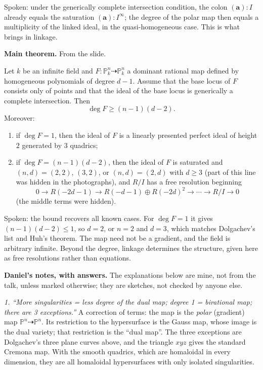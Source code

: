 \medskip\noindent
Spoken: under the generically complete
intersection condition, the colon $(\mathbf
a) : I$ already equals the saturation
$(\mathbf a) : I^\infty$; the degree of the
polar map then equals a multiplicity of the
linked ideal, in the quasi-homogeneous case.
This is what brings in linkage.

\medskip\noindent
{\bf Main theorem.} From the slide.

\begin{theorem}
\label{theorem-hassanzadeh-main}
Let $k$ be an infinite field and
$F : \mathbb{P}^n_k \dashrightarrow
\mathbb{P}^n_k$ a dominant rational map
defined by homogeneous polynomials of degree
$d-1$. Assume that the base locus of $F$
consists only of points and that the ideal
of the base locus is generically a complete
intersection. Then
$$
\deg F \ge (n-1)(d-2).
$$
Moreover:
\begin{enumerate}
\item if $\deg F = 1$, then the ideal of $F$
is a linearly presented perfect ideal of
height $2$ generated by $3$ quadrics;
\item if $\deg F = (n-1)(d-2)$, then the
ideal of $F$ is saturated and
$(n,d) = (2,2)$, $(3,2)$, or
$(n,d) = (2,d)$ with $d \ge 3$ (part of this
line was hidden in the photographs), and
$R/I$ has a free resolution beginning
$$
0 \to R(-2d-1) \to
R(-d-1) \oplus R(-2d)^2 \to \cdots
\to R/I \to 0
$$
(the middle terms were hidden).
\end{enumerate}
\end{theorem}

\noindent
Spoken: the bound recovers all known cases.
For $\deg F = 1$ it gives
$(n-1)(d-2) \le 1$, so $d = 2$, or $n = 2$
and $d = 3$, which matches Dolgachev's list
and Huh's theorem. The map need not be a
gradient, and the field is arbitrary
infinite. Beyond the degree, linkage
determines the structure, given here as free
resolutions rather than equations.

\medskip\noindent
{\bf Daniel's notes, with answers.} The
explanations below are mine, not from the
talk, unless marked otherwise; they are
sketches, not checked by anyone else.

\medskip\noindent
{\it 1. ``More singularities = less degree of
the dual map; degree 1 = birational map;
there are 3 exceptions.''} A correction of
terms: the map is the \emph{polar} (gradient)
map $\mathbb{P}^n \dashrightarrow
\mathbb{P}^n$. Its restriction to the
hypersurface is the Gauss map, whose image
is the dual variety; that restriction is the
``dual map''. The three exceptions are
Dolgachev's three plane curves above, and the
triangle $xyz$ gives the standard Cremona
map. With the smooth quadrics, which are
homaloidal in every dimension, they are all
homaloidal hypersurfaces with only isolated
singularities.

